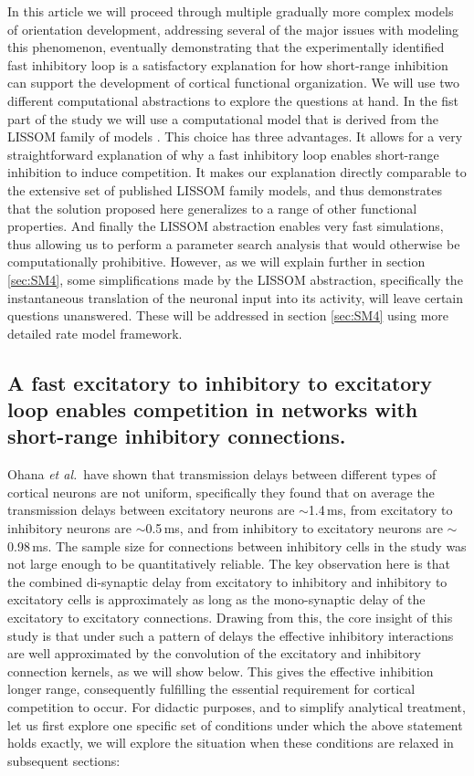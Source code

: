 \documentclass[utf8]{frontiersSCNS}
\newcommand{\etal}{\textit{et al.}}
\begin{document}
In this article we will proceed through multiple gradually more complex models of orientation development, addressing several 
of the major issues with modeling this phenomenon, eventually demonstrating that the experimentally identified fast inhibitory loop is a satisfactory explanation for how short-range inhibition can support the development of cortical functional organization. We will use two different computational abstractions to explore the questions at hand. In the fist part of the study we will use a computational model that is derived from the LISSOM family of models \citep{CMVC}. This choice has three advantages. It allows for a very straightforward explanation of why 
a fast inhibitory loop enables short-range inhibition to induce competition. It makes our explanation directly comparable to the 
extensive set of published LISSOM family models, and thus demonstrates that the solution proposed here generalizes to a range of other 
functional properties. And finally the LISSOM abstraction enables very fast simulations, thus allowing us to perform 
a parameter search analysis that would otherwise be computationally prohibitive. However, as we will explain further in section \ref{sec:SM4}, some simplifications made by the LISSOM abstraction, specifically the instantaneous translation of the neuronal input into its activity, will leave 
certain questions unanswered. These will be addressed in section \ref{sec:SM4} using more detailed rate model framework.


\subsection{A fast excitatory to inhibitory to excitatory loop enables competition in networks with short-range inhibitory connections.} \label{sec:SM1}

Ohana \etal\,\citep{Ohana2012} have shown that transmission delays between different types of cortical neurons are not uniform, specifically they found that on average the transmission delays between excitatory neurons are $\sim$1.4\,ms, from excitatory to inhibitory neurons are $\sim$0.5\,ms, and from inhibitory to excitatory neurons are $\sim$0.98\,ms. The sample size for connections
between inhibitory cells in the study was not large enough to be quantitatively reliable. The key observation here is that the 
combined di-synaptic delay from excitatory to inhibitory and inhibitory to excitatory cells is approximately as long as the mono-synaptic delay
of the excitatory to excitatory connections. Drawing from this, the core insight of this study is that under such a pattern of delays
the effective inhibitory interactions are well approximated by the convolution of the excitatory and inhibitory connection kernels, as we will
show below. This gives the effective inhibition longer range, consequently fulfilling the essential requirement for cortical competition to occur.
For didactic purposes, and to simplify analytical treatment, let us first explore one specific set of conditions under which the above statement holds exactly, we will explore the situation when these conditions are relaxed in subsequent sections: 
\end{document}
